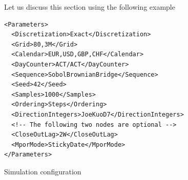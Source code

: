 \documentclass[12pt, a4paper]{article}
\begin{document}
{{Let us discuss this section using the following example

\begin{listing}[H]
\begin{verbatim}
<Parameters>
  <Discretization>Exact</Discretization>
  <Grid>80,3M</Grid>
  <Calendar>EUR,USD,GBP,CHF</Calendar>
  <DayCounter>ACT/ACT</DayCounter>
  <Sequence>SobolBrownianBridge</Sequence>
  <Seed>42</Seed>
  <Samples>1000</Samples>
  <Ordering>Steps</Ordering>
  <DirectionIntegers>JoeKuoD7</DirectionIntegers>
  <!-- The following two nodes are optional -->
  <CloseOutLag>2W</CloseOutLag>
  <MporMode>StickyDate</MporMode>
</Parameters>
\end{verbatim}
\caption{Simulation configuration}
\label{lst:simulation_params_configuration}
\end{listing}

}}
\end{document}
